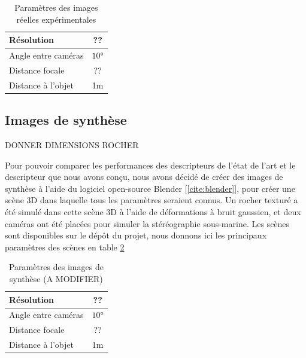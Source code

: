 \documentclass[
	a4paper, %
	10pt, %
	unnumberedsections, %
	twoside, %
]{LTJournalArticle}
\begin{document}
\begin{table}[t]
	\begin{adjustbox}{width=\columnwidth, left}
		\begin{tabular}{l c}
			\hline
			Résolution          & ??    \\
			\hline
			Angle entre caméras & $10$° \\
			Distance focale     & ??    \\
			Distance à l'objet  & 1m    \\
			\hline
		\end{tabular}
	\end{adjustbox}
	\label{table:params_irl_imgs}
	\caption{Paramètres des images réelles expérimentales}
\end{table}

\subsection{Images de synthèse}

DONNER DIMENSIONS ROCHER

Pour pouvoir comparer les performances des descripteurs de l'état de l'art et le descripteur que nous avons conçu, nous avons décidé de créer des images de synthèse à l'aide du logiciel open-source Blender [\ref{cite:blender}], pour créer une scène 3D dans laquelle tous les paramètres seraient connus.
Un rocher texturé a été simulé dans cette scène 3D à l'aide de déformations à bruit gaussien, et deux caméras ont été placées pour simuler la stéréographie sous-marine.
Les scènes sont disponibles sur le dépôt du projet, nous donnons ici les principaux paramètres des scènes en table \ref{table:params_syn_imgs}

\begin{table}[t]
	\begin{adjustbox}{width=\columnwidth, left}
		\begin{tabular}{l c}
			\hline
			Résolution          & ??    \\
			\hline
			Angle entre caméras & $10$° \\
			Distance focale     & ??    \\
			Distance à l'objet  & 1m    \\
			\hline
		\end{tabular}
	\end{adjustbox}
	\label{table:params_syn_imgs}
	\caption{Paramètres des images de synthèse (A MODIFIER)}
\end{table}
\end{document}
